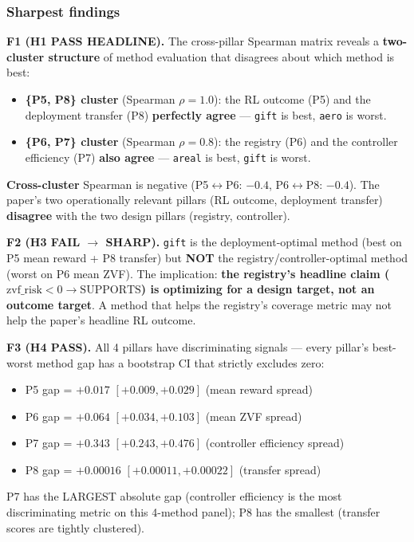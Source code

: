 \documentclass{article}
\begin{document}
\subsubsection{Sharpest findings}\label{sec:synth-iter192-d20-findings}

\textbf{F1 (H1 PASS HEADLINE).}
The cross-pillar Spearman matrix reveals a \textbf{two-cluster structure}
of method evaluation that disagrees about which method is best:
\begin{itemize}
\item \textbf{\{P5, P8\} cluster} (Spearman $\rho = 1.0$): the RL outcome
  (P5) and the deployment transfer (P8) \textbf{perfectly agree} ---
  \texttt{gift} is best, \texttt{aero} is worst.
\item \textbf{\{P6, P7\} cluster} (Spearman $\rho = 0.8$): the registry
  (P6) and the controller efficiency (P7) \textbf{also agree} ---
  \texttt{areal} is best, \texttt{gift} is worst.
\end{itemize}
\textbf{Cross-cluster} Spearman is negative (P5$\leftrightarrow$P6:
$-0.4$, P6$\leftrightarrow$P8: $-0.4$). The paper's two operationally
relevant pillars (RL outcome, deployment transfer) \textbf{disagree}
with the two design pillars (registry, controller).

\textbf{F2 (H3 FAIL $\rightarrow$ SHARP).}
\texttt{gift} is the deployment-optimal method (best on P5 mean reward
+ P8 transfer) but \textbf{NOT} the registry/controller-optimal method
(worst on P6 mean ZVF). The implication: \textbf{the registry's headline
claim ($\mathrm{zvf\_risk}{<}0 \rightarrow \mathrm{SUPPORTS}$) is
optimizing for a design target, not an outcome target}. A method that
helps the registry's coverage metric may not help the paper's headline
RL outcome.

\textbf{F3 (H4 PASS).}
All 4 pillars have discriminating signals --- every pillar's best-worst
method gap has a bootstrap CI that strictly excludes zero:
\begin{itemize}
\item P5 gap = $+0.017$ $[+0.009, +0.029]$ (mean reward spread)
\item P6 gap = $+0.064$ $[+0.034, +0.103]$ (mean ZVF spread)
\item P7 gap = $+0.343$ $[+0.243, +0.476]$ (controller efficiency spread)
\item P8 gap = $+0.00016$ $[+0.00011, +0.00022]$ (transfer spread)
\end{itemize}
P7 has the LARGEST absolute gap (controller efficiency is the most
discriminating metric on this 4-method panel); P8 has the smallest
(transfer scores are tightly clustered).
\end{document}
